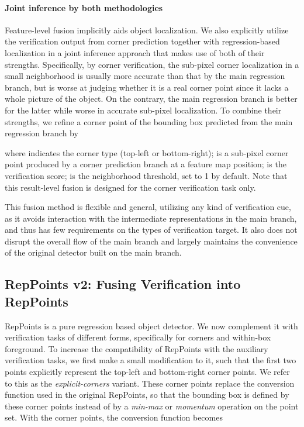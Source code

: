 \documentclass{article}
\begin{document}
\paragraph{Joint inference by both methodologies} Feature-level fusion implicitly aids object localization. We also explicitly utilize the verification output from corner prediction together with regression-based localization in a joint inference approach that makes use of both of their strengths. Specifically, by corner verification, the sub-pixel corner localization in a small neighborhood is usually more accurate than that by the main regression branch, but is worse at judging whether it is a real corner point since it lacks a whole picture of the object. On the contrary, the main regression branch is better for the latter while worse in accurate sub-pixel localization. To combine their strengths, we refine a corner point  of the bounding box predicted from the main regression branch by

where  indicates the corner type (top-left or bottom-right);  is a sub-pixel corner point produced by a corner prediction branch at a feature map position;  is the verification score;  is the neighborhood threshold, set to 1 by default. Note that this result-level fusion is designed for the corner verification task only.

This fusion method is flexible and general, utilizing any kind of verification cue, as it avoids interaction with the intermediate representations in the main branch, and thus has few requirements on the types of verification target. It also does not disrupt the overall flow of the main branch and largely maintains the convenience of the original detector built on the main branch.

\subsection{RepPoints v2: Fusing Verification into RepPoints} \label{sec:repptsv2}

RepPoints is a pure regression based object detector. We now complement it with verification tasks of different forms, specifically for corners and within-box foreground. To increase the compatibility of RepPoints with the auxiliary verification tasks, we first make a small modification to it, such that the first two points explicitly represent the top-left and bottom-right corner points. We refer to this as the {\em explicit-corners} variant. These corner points replace the conversion function used in the original RepPoints, so that the bounding box is defined by these corner points instead of by a \textit{min-max} or \textit{momentum} operation on the point set. With the corner points, the conversion function becomes
\end{document}
